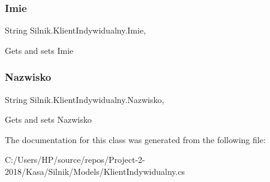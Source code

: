 \subsubsection{\texorpdfstring{Imie}{Imie}}
{\footnotesize\ttfamily String Silnik.\+Klient\+Indywidualny.\+Imie\hspace{0.3cm}{\ttfamily [get]}, {\ttfamily [set]}}



Gets and sets Imie 

\mbox{\label{class_silnik_1_1_klient_indywidualny_ab5a0bdb5ed8412c91aeccb2833996607}} 
\subsubsection{\texorpdfstring{Nazwisko}{Nazwisko}}
{\footnotesize\ttfamily String Silnik.\+Klient\+Indywidualny.\+Nazwisko\hspace{0.3cm}{\ttfamily [get]}, {\ttfamily [set]}}



Gets and sets Nazwisko 



The documentation for this class was generated from the following file\+:\begin{DoxyCompactItemize}
\item 
C\+:/\+Users/\+H\+P/source/repos/\+Project-\/2-\/2018/\+Kasa/\+Silnik/\+Models/Klient\+Indywidualny.\+cs\end{DoxyCompactItemize}
